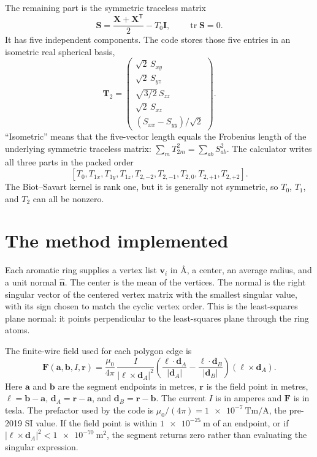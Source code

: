 \documentclass[11pt]{article}
\begin{document}
The remaining part is the symmetric traceless matrix
\begin{equation}
  \bm S=\frac{\bm X+\bm X^{\mathsf T}}{2}-T_0\bm I,
  \qquad \operatorname{tr}\bm S=0 .
  \label{eq:sym-trace}
\end{equation}
It has five independent components. The code stores those five entries in an
isometric real spherical basis,
\begin{equation}
  \bm T_2 =
  \begin{pmatrix}
    \sqrt{2}\,S_{xy}\\
    \sqrt{2}\,S_{yz}\\
    \sqrt{3/2}\,S_{zz}\\
    \sqrt{2}\,S_{xz}\\
    (S_{xx}-S_{yy})/\sqrt{2}
  \end{pmatrix}.
  \label{eq:t2}
\end{equation}
``Isometric'' means that the five-vector length equals the Frobenius length of
the underlying symmetric traceless matrix:
\(\sum_m T_{2m}^2=\sum_{ab}S_{ab}^2\). The calculator writes all three parts in
the packed order
\[
  [T_0,T_{1x},T_{1y},T_{1z},
    T_{2,-2},T_{2,-1},T_{2,0},T_{2,+1},T_{2,+2}] .
\]
The Biot--Savart kernel is rank one, but it is generally not symmetric, so
\(T_0\), \(T_1\), and \(T_2\) can all be nonzero.

\section{The method implemented}

Each aromatic ring supplies a vertex list \(\bm v_i\) in \(\si{\angstrom}\), a
center, an average radius, and a unit normal \(\hat{\bm n}\). The center is the
mean of the vertices. The normal is the right singular vector of the centered
vertex matrix with the smallest singular value, with its sign chosen to match
the cyclic vertex order. This is the least-squares plane normal: it points
perpendicular to the least-squares plane through the ring atoms.

The finite-wire field used for each polygon edge is
\begin{equation}
  \bm F(\bm a,\bm b,I,\bm r)=
  \frac{\mu_0}{4\pi}\,
  \frac{I}{|\bm\ell\times\bm d_A|^2}
  \left(
    \frac{\bm\ell\cdot\bm d_A}{|\bm d_A|}
    -\frac{\bm\ell\cdot\bm d_B}{|\bm d_B|}
  \right)(\bm\ell\times\bm d_A).
  \label{eq:wire}
\end{equation}
Here \(\bm a\) and \(\bm b\) are the segment endpoints in metres,
\(\bm r\) is the field point in metres, \(\bm\ell=\bm b-\bm a\),
\(\bm d_A=\bm r-\bm a\), and \(\bm d_B=\bm r-\bm b\). The current \(I\) is in
amperes and \(\bm F\) is in tesla. The prefactor used by the code is
\(\mu_0/(4\pi)=\SI{1e-7}{\tesla\metre\per\ampere}\), the pre-2019 SI value.
If the field point is within \(\SI{1e-25}{\metre}\) of an endpoint, or if
\(|\bm\ell\times\bm d_A|^2<\SI{1e-70}{\metre\squared}\), the segment returns
zero rather than evaluating the singular expression.
\end{document}
